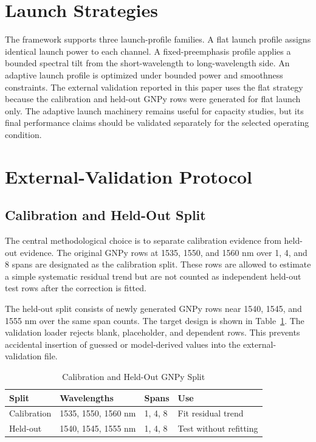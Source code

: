 \documentclass[conference]{IEEEtran}
\begin{document}
\section{Launch Strategies}
The framework supports three launch-profile families. A flat launch profile assigns identical launch power to each channel. A fixed-preemphasis profile applies a bounded spectral tilt from the short-wavelength to long-wavelength side. An adaptive launch profile is optimized under bounded power and smoothness constraints. The external validation reported in this paper uses the flat strategy because the calibration and held-out GNPy rows were generated for flat launch only. The adaptive launch machinery remains useful for capacity studies, but its final performance claims should be validated separately for the selected operating condition.

\section{External-Validation Protocol}
\subsection{Calibration and Held-Out Split}
The central methodological choice is to separate calibration evidence from held-out evidence. The original GNPy rows at 1535, 1550, and 1560 nm over 1, 4, and 8 spans are designated as the calibration split. These rows are allowed to estimate a simple systematic residual trend but are not counted as independent held-out test rows after the correction is fitted.

The held-out split consists of newly generated GNPy rows near 1540, 1545, and 1555 nm over the same span counts. The target design is shown in Table~\ref{tab:split}. The validation loader rejects blank, placeholder, and dependent rows. This prevents accidental insertion of guessed or model-derived values into the external-validation file.

\begin{table}[!t]
\caption{Calibration and Held-Out GNPy Split}
\label{tab:split}
\centering
\begin{tabular}{llll}
\toprule
Split & Wavelengths & Spans & Use \\
\midrule
Calibration & 1535, 1550, 1560 nm & 1, 4, 8 & Fit residual trend \\
Held-out & 1540, 1545, 1555 nm & 1, 4, 8 & Test without refitting \\
\bottomrule
\end{tabular}
\end{table}
\end{document}
